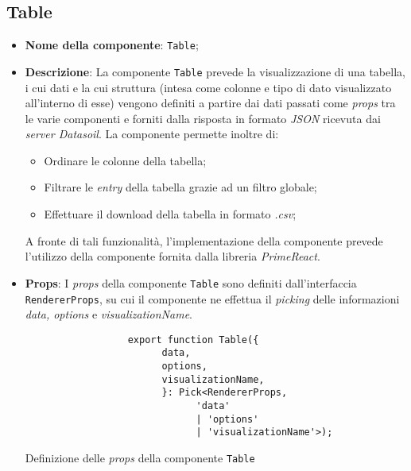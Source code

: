\subsection{Table}
\begin{itemize}
      \item \textbf{Nome della componente}: \texttt{Table};
      \item \textbf{Descrizione}: La componente \texttt{Table} prevede la visualizzazione di una tabella, i cui dati e la cui struttura (intesa come colonne e tipo di dato visualizzato
            all'interno di esse) vengono definiti a partire dai dati passati come \textit{props} tra le varie componenti e forniti dalla risposta in formato \textit{JSON} ricevuta dai \textit{server Datasoil}. \newline
            La componente permette inoltre di:
            \begin{itemize}
                  \item Ordinare le colonne della tabella;
                  \item Filtrare le \textit{entry} della tabella grazie ad un filtro globale;
                  \item Effettuare il download della tabella in formato \textit{.csv};
            \end{itemize}
            A fronte di tali funzionalità, l'implementazione della componente prevede l'utilizzo della componente fornita dalla libreria \textit{PrimeReact}.
      \item \textbf{Props}: I \textit{props} della componente \texttt{Table} sono definiti dall'interfaccia \\
            \texttt{RendererProps}, su cui il componente ne effettua il \textit{picking}
            delle informazioni \textit{data, options} e \textit{visualizationName}.
            \begin{listing}[H]
                  \begin{verbatim}
                  export function Table({
                        data,
                        options,
                        visualizationName,
                        }: Pick<RendererProps, 
                              'data' 
                              | 'options' 
                              | 'visualizationName'>);
                  \end{verbatim}
                  \caption{Definizione delle \textit{props} della componente \texttt{Table}}
                  \label{listing:tableProps}
            \end{listing}

\end{itemize}
